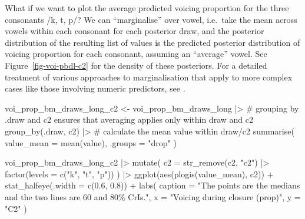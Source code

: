 \documentclass[
  authoryear,
  preprint,
  3p]{elsarticle}
\newenvironment{Shaded}{\begin{snugshade}}{\end{snugshade}}
\newcommand{\AttributeTok}[1]{\textcolor[rgb]{0.40,0.45,0.13}{#1}}
\newcommand{\CommentTok}[1]{\textcolor[rgb]{0.37,0.37,0.37}{#1}}
\newcommand{\FloatTok}[1]{\textcolor[rgb]{0.68,0.00,0.00}{#1}}
\newcommand{\FunctionTok}[1]{\textcolor[rgb]{0.28,0.35,0.67}{#1}}
\newcommand{\NormalTok}[1]{\textcolor[rgb]{0.00,0.23,0.31}{#1}}
\newcommand{\OtherTok}[1]{\textcolor[rgb]{0.00,0.23,0.31}{#1}}
\newcommand{\SpecialCharTok}[1]{\textcolor[rgb]{0.37,0.37,0.37}{#1}}
\newcommand{\StringTok}[1]{\textcolor[rgb]{0.13,0.47,0.30}{#1}}
\begin{document}
What if we want to plot the average predicted voicing proportion for the
three consonants /k, t, p/? We can ``marginalise'' over vowel, i.e.~take
the mean across vowels within each consonant for each posterior draw,
and the posterior distribution of the resulting list of values is the
predicted posterior distribution of voicing proportion for each
consonant, assuming an ``average'' vowel. See
Figure~\ref{fig-voi-pbdl-c2} for the density of these posteriors. For a
detailed treatment of various approaches to marginalisation that apply
to more complex cases like those involving numeric predictors, see
\citet{arelbundock2024}.

\begin{Shaded}
\begin{Highlighting}[]
\NormalTok{voi\_prop\_bm\_draws\_long\_c2 }\OtherTok{\textless{}{-}}\NormalTok{ voi\_prop\_bm\_draws\_long }\SpecialCharTok{|\textgreater{}} 
  \CommentTok{\# grouping by .draw and c2 ensures that averaging applies only within draw and c2}
  \FunctionTok{group\_by}\NormalTok{(.draw, c2) }\SpecialCharTok{|\textgreater{}} 
  \CommentTok{\# calculate the mean value within draw/c2}
  \FunctionTok{summarise}\NormalTok{(}
    \AttributeTok{value\_mean =} \FunctionTok{mean}\NormalTok{(value), }\AttributeTok{.groups =} \StringTok{"drop"}
\NormalTok{  )}
\end{Highlighting}
\end{Shaded}

\begin{Shaded}
\begin{Highlighting}[]
\NormalTok{voi\_prop\_bm\_draws\_long\_c2 }\SpecialCharTok{|\textgreater{}} 
  \FunctionTok{mutate}\NormalTok{(}
    \AttributeTok{c2 =} \FunctionTok{str\_remove}\NormalTok{(c2, }\StringTok{"c2"}\NormalTok{) }\SpecialCharTok{|\textgreater{}} \FunctionTok{factor}\NormalTok{(}\AttributeTok{levels =} \FunctionTok{c}\NormalTok{(}\StringTok{"k"}\NormalTok{, }\StringTok{"t"}\NormalTok{, }\StringTok{"p"}\NormalTok{))}
\NormalTok{  ) }\SpecialCharTok{|\textgreater{}} 
  \FunctionTok{ggplot}\NormalTok{(}\FunctionTok{aes}\NormalTok{(}\FunctionTok{plogis}\NormalTok{(value\_mean), c2)) }\SpecialCharTok{+}
  \FunctionTok{stat\_halfeye}\NormalTok{(}\AttributeTok{.width =} \FunctionTok{c}\NormalTok{(}\FloatTok{0.6}\NormalTok{, }\FloatTok{0.8}\NormalTok{)) }\SpecialCharTok{+}
  \FunctionTok{labs}\NormalTok{(}
    \AttributeTok{caption =} \StringTok{"The points are the medians and the two lines are 60 and 80\% CrIs."}\NormalTok{,}
    \AttributeTok{x =} \StringTok{"Voicing during closure (prop)"}\NormalTok{,}
    \AttributeTok{y =} \StringTok{"C2"}
\NormalTok{  )}
\end{Highlighting}
\end{Shaded}
\end{document}

